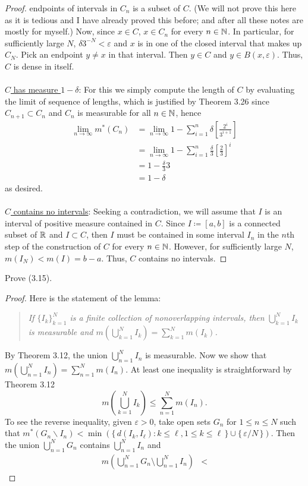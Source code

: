 \begin{proof}
{    endpoints of intervals in $C_n$ is a subset of $C$}. (We will not prove
  this here as it is tedious and I have already proved this before; and
  after all these notes are mostly for myself.) Now, since $x\in C$,
  $x\in C_n$ for every $n\in\mathbb{N}$. In particular, for sufficiently large
  $N$, $\delta 3^{-N}<\varepsilon$ and $x$ is in one of the closed interval
  that makes up $C_N$. Pick an endpoint $y\neq x$ in that interval. Then
  $y\in C$ and $y\in B(x,\varepsilon)$. Thus, $C$ is dense in itself.
  \\\\
  \underline{$C$ has measure $1-\delta$}: For this we simply compute the
  length of $C$ by evaluating the limit of sequence of lengths, which is
  justified by Theorem 3.26 since $C_{n+1}\subset C_n$ and $C_n$ is
  measurable for all $n\in\mathbb{N}$, hence
  \begin{align*}
    \lim_{n\to\infty}m^*(C_n)
    &=\lim_{n\to\infty} 1-\sum_{i=1}^n\delta\left[\frac{2^i}{3^{i+1}}\right]\\
    &=\lim_{n\to\infty}1-\sum_{i=1}^n\frac{\delta}{3}\left[\frac{2}{3}\right]^i\\
    &=1-\frac{\delta}{3}3\\
    &=1-\delta
  \end{align*}
  as desired.
  \\\\
  \underline{$C$ contains no intervals}: Seeking a contradiction, we will
  assume that $I$ is an interval of positive measure contained in
  $C$. Since $I\coloneq[a,b]$ is a connected subset of $\mathbb{R}$ and
  $I\subset C$, then $I$ must be contained in some interval $I_n$ in the
  $n$th step of the construction of $C$ for every $n\in\mathbb{N}$. However, for
  sufficiently large $N$, $m(I_N)<m(I)=b-a$. Thus, $C$ contains no
  intervals.
\end{proof}

\begin{problem}
  Prove (3.15).
\end{problem}
\begin{proof}
  Here is the statement of the lemma:
  \begin{quote}
    \emph{If ${\{I_k\}}_{k=1}^{N}$ is a finite collection of nonoverlapping
      intervals, then $\bigcup_{k=1}^NI_k$ is measurable and
      $m\left(\bigcup_{k=1}^NI_k\right)=\sum_{k=1}^Nm(I_k)$.}
  \end{quote}
  By Theorem 3.12, the union $\bigcup_{n=1}^N I_n$ is measurable. Now we
  show that $m\left(\bigcup_{n=1}^NI_n\right)=\sum_{n=1}^Nm(I_n)$. At least
  one inequality is straightforward by Theorem 3.12
  \[
    m\left(\bigcup_{k=1}^N I_k\right)\leq\sum_{n=1}^Nm(I_n).
  \]
  To see the reverse inequality, given $\varepsilon>0$, take open sets
  $G_n$ for $1\leq n\leq N$ such that
  $m^*(G_n\smallsetminus I_n)<\min\left(\{\,d(I_k,I_\ell):k\leq\ell,1\leq
    k\leq\ell\,\}\cup\{\,\varepsilon/N\,\}\right)$. Then the union
  $\bigcup_{n=1}^N G_n$ contains $\bigcup_{n=1}^N I_n$ and
  \begin{align*}
    m\left(\bigcup_{n=1}^N G_n\setminus\bigcup_{n=1}^N I_n\right)
    &<
  \end{align*}
\end{proof}

